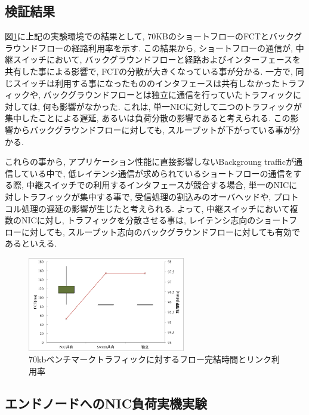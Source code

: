 \documentclass[11pt, a4paper, twocolumn]{jsarticle}
\begin{document}
\subsection{検証結果}
図\ref{fig:improve}に上記の実験環境での結果として, 70KBのショートフローのFCTとバックグラウンドフローの経路利用率を示す.
この結果から, ショートフローの通信が, 中継スイッチにおいて, バックグラウンドフローと経路およびインターフェースを共有した事による影響で,
FCTの分散が大きくなっている事が分かる.
一方で, 同じスイッチは利用する事になったもののインタフェースは共有しなかったトラフィックや,
バックグラウンドフローとは独立に通信を行っていたトラフィックに対しては, 何も影響がなかった.
これは, 単一NICに対して二つのトラフィックが集中したことによる遅延,
あるいは負荷分散の影響であると考えられる.
この影響からバックグラウンドフローに対しても, スループットが下がっている事が分かる.

これらの事から, アプリケーション性能に直接影響しないBackgroung trafficが通信している中で,
低レイテンシ通信が求められているショートフローの通信をする際, 中継スイッチでの利用するインタフェースが競合する場合,
単一のNICに対しトラフィックが集中する事で, 受信処理の割込みのオーバヘッドや, プロトコル処理の遅延の影響が生じたと考えられる.
よって, 中継スイッチにおいて複数のNICに対し, トラフィックを分散させる事は, レイテンシ志向のショートフローに対しても,
スループット志向のバックグラウンドフローに対しても有効であるといえる.

\begin{figure}[h]
    \begin{center}
    \includegraphics[autoebb, width=195pt]{./img/switch_verif.pdf}
    \caption{70kbベンチマークトラフィックに対するフロー完結時間とリンク利用率}
    \label{fig:improve}
    \end{center}
\end{figure}

\subsection{エンドノードへのNIC負荷実機実験}
\end{document}
